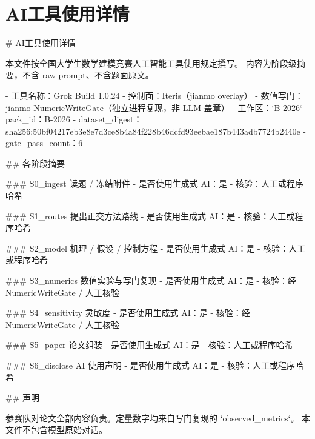 \documentclass[UTF8]{ctexart}
\begin{document}
\section*{AI工具使用详情}
\# AI工具使用详情

本文件按全国大学生数学建模竞赛人工智能工具使用规定撰写。
内容为阶段级摘要，不含 raw prompt、不含题面原文。

- 工具名称：Grok Build 1.0.24
- 控制面：Iteris（jianmo overlay）
- 数值写门：jianmo NumericWriteGate（独立进程复现，非 LLM 盖章）
- 工作区：`B-2026`
- pack\_id：B-2026
- dataset\_digest：sha256:50bf04217eb3e8e7d3ce8b4a84f228b46dcfd93eebae187b443adb7724b2440e
- gate\_pass\_count：6

\#\# 各阶段摘要

\#\#\# S0\_ingest 读题 / 冻结附件
- 是否使用生成式 AI：是
- 核验：人工或程序哈希

\#\#\# S1\_routes 提出正交方法路线
- 是否使用生成式 AI：是
- 核验：人工或程序哈希

\#\#\# S2\_model 机理 / 假设 / 控制方程
- 是否使用生成式 AI：是
- 核验：人工或程序哈希

\#\#\# S3\_numerics 数值实验与写门复现
- 是否使用生成式 AI：是
- 核验：经 NumericWriteGate / 人工核验

\#\#\# S4\_sensitivity 灵敏度
- 是否使用生成式 AI：是
- 核验：经 NumericWriteGate / 人工核验

\#\#\# S5\_paper 论文组装
- 是否使用生成式 AI：是
- 核验：人工或程序哈希

\#\#\# S6\_disclose AI 使用声明
- 是否使用生成式 AI：是
- 核验：人工或程序哈希

\#\# 声明

参赛队对论文全部内容负责。定量数字均来自写门复现的 `observed\_metrics`。
本文件不包含模型原始对话。
\end{document}
